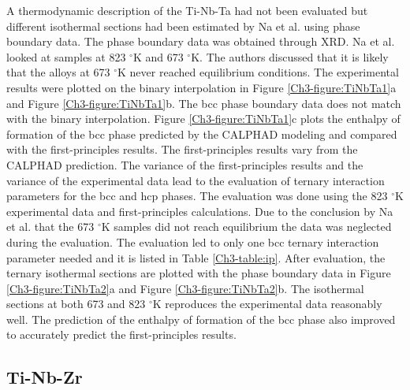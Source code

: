 A thermodynamic description of the Ti-Nb-Ta had not been evaluated but different isothermal sections had been estimated by Na et al. \cite{Na2001} using phase boundary data. The phase boundary data was obtained through XRD. Na et al. looked at samples at 823 $^\circ$K and 673 $^\circ$K. The authors discussed that it is likely that the alloys at 673 $^\circ$K never reached equilibrium conditions. The experimental results were plotted on the binary interpolation in Figure \ref{Ch3-figure:TiNbTa1}a and Figure \ref{Ch3-figure:TiNbTa1}b. The bcc phase boundary data does not match with the binary interpolation. Figure \ref{Ch3-figure:TiNbTa1}c plots the enthalpy of formation of the bcc phase predicted by the CALPHAD modeling and compared with the first-principles results. The first-principles results vary from the CALPHAD prediction. The variance of the first-principles results and the variance of the experimental data lead to the evaluation of ternary interaction parameters for the bcc and hcp phases. The evaluation was done using the 823 $^\circ$K experimental data and first-principles calculations. Due to the conclusion by Na et al. that the 673 $^\circ$K samples did not reach equilibrium the data was neglected during the evaluation. The evaluation led to only one bcc ternary interaction parameter needed and it is listed in Table \ref{Ch3-table:ip}. After evaluation, the ternary isothermal sections are plotted with the phase boundary data in Figure \ref{Ch3-figure:TiNbTa2}a and Figure \ref{Ch3-figure:TiNbTa2}b. The isothermal sections at both 673 and 823 $^\circ$K reproduces the experimental data reasonably well. The prediction of the enthalpy of formation of the bcc phase also improved to accurately predict the first-principles results.

\subsection{Ti-Nb-Zr}

